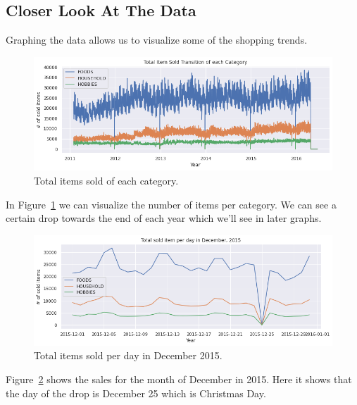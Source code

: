 \documentclass[10pt,twocolumn,letterpaper]{article}
\begin{document}
\subsection{Closer Look At The Data}
  Graphing the data allows us to visualize some of the shopping trends.

\begin{figure}
  \begin{center}
    \includegraphics[width=0.8\linewidth]{img/totalItemSoldofEachCategory.png}
  \end{center}
  \caption{Total items sold of each category.\cite{ryuheeeei_2020}}
  \label{fig:totalItemSoldofEachCategory}
\end{figure}
  In Figure~\ref{fig:totalItemSoldofEachCategory} we can visualize the number of
  items per category. We can see a certain drop towards the end of each year
  which we'll see in later graphs.

\begin{figure}
  \begin{center}
    \includegraphics[width=0.8\linewidth]{img/totalSoldItemPerDayDec2015.png}
  \end{center}
    \caption{Total items sold per day in December 2015.\cite{ryuheeeei_2020}}
  \label{fig:totalSoldItemPerDayDec2015}
\end{figure}
  Figure~\ref{fig:totalSoldItemPerDayDec2015} shows the sales for the month of
  December in 2015. Here it shows that the day of the drop is December 25 which
  is Christmas Day.
\end{document}
